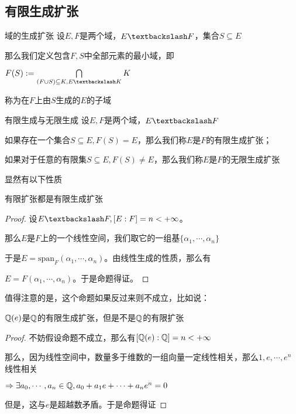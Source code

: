 \documentclass[12pt, a4paper, oneside, UTF8]{ctexbook}
\begin{document}
		\subsection{有限生成扩张}
			\begin{defn}{域的生成扩张}{}
				设$E,F$是两个域，$E\textbackslash F$，集合$S \subseteq E$

				那么我们定义包含$F,S$中全部元素的最小域，即

				$F(S) := \bigcap\limits_{(F \cup S) \subseteq K,E \textbackslash K} K$

				称为在$F$上由$S$生成的$E$的子域
			\end{defn}
			\begin{defn}{有限生成与无限生成}{}
				设$E,F$是两个域，$E\textbackslash F$

				如果存在一个集合$S \subseteq E,F(S) = E$，那么我们称$E$是$F$的有限生成扩张；

				如果对于任意的有限集$S \subseteq E,F(S) \neq E$，那么我们称$E$是$F$的无限生成扩张
			\end{defn}
			显然有以下性质
			\begin{proposition}
				有限扩张都是有限生成扩张
			\end{proposition}
			\begin{proof}
				设$E \textbackslash F,[E:F]=n < +\infty$。

				那么$E$是$F$上的一个线性空间，我们取它的一组基$\{\alpha_1,\cdots,\alpha_n\}$

				于是$E = \text{span}_F (\alpha_1,\cdots,\alpha_n)$。由线性生成的性质，那么有

				$E = F(\alpha_1,\cdots,\alpha_n)$。于是命题得证。
			\end{proof}
			值得注意的是，这个命题如果反过来则不成立，比如说：
			\begin{example}
				$\mathbb{Q}(e)$是$\mathbb{Q}$的有限生成扩张，但是不是$\mathbb{Q}$的有限扩张
			\end{example}
			\begin{proof}
				不妨假设命题不成立，那么有$[\mathbb{Q}(e):\mathbb{Q}]=n < +\infty$

				那么，因为线性空间中，数量多于维数的一组向量一定线性相关，那么$1,e,\cdots,e^n$线性相关
				
				$\Rightarrow \exists a_0,\cdots,a_n \in \mathbb{Q},a_0+a_1 e +\cdots+a_n e^n=0$

				但是，这与$e$是超越数矛盾。于是命题得证
			\end{proof}
\end{document}
